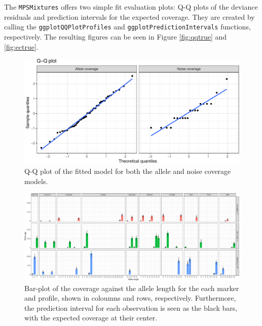 \documentclass[]{article}
\begin{document}
The \texttt{MPSMixtures} offers two simple fit evaluation plots: Q-Q
plots of the deviance residuals and prediction intervals for the
expected coverage. They are created by calling the
\texttt{ggplotQQPlotProfiles} and \texttt{ggplotPredictionIntervals}
functions, respectively. The resulting figures can be seen in Figure
\ref{fig:qqtrue} and \ref{fig:ectrue}.

\begin{figure}[ht!]

{\centering \includegraphics{MPSMixturesVignette_files/figure-latex/figQQ-1} 

}

\caption{\label{fig:qqtrue}Q-Q plot of the fitted model for both the allele and noise coverage models.}\label{fig:figQQ}
\end{figure}

\begin{figure}[ht!]

{\centering \includegraphics{MPSMixturesVignette_files/figure-latex/figEC-1} 

}

\caption{\label{fig:ectrue}Bar-plot of the coverage against the allele length for the each marker and profile, shown in coloumns and rows, respectively. Furthermore, the prediction interval for each observation is seen as the black bars, with the expected coverage at their center.}\label{fig:figEC}
\end{figure}
\end{document}
